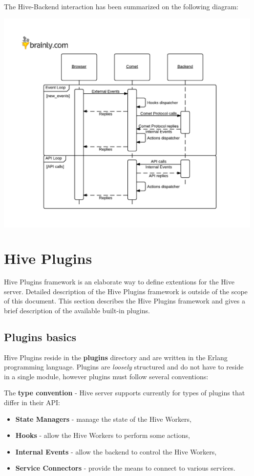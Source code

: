 \documentclass[a4paper]{article}
\begin{document}
\noindent
The Hive-Backend interaction has been summarized on the following diagram:

\begin{center}
\includegraphics[scale=1.0]{./img/hive_usage.pdf}
\end{center}
\section{Hive Plugins}
\label{sec-8}
\label{ref-plugins}

Hive Plugins framework is an elaborate way to define extentions for the Hive server. Detailed description of the Hive Plugins framework is outside of the scope of this document. This section describes the Hive Plugins framework and gives a brief description of the available built-in plugins.
\subsection{Plugins basics}
\label{sec-8-1}

Hive Plugins reside in the \textbf{plugins} directory and are written in the Erlang programming language. Plugins are \emph{loosely} structured and do not have to reside in a single module, however plugins must follow several conventions:

\noindent
The \textbf{type convention} - Hive server supports currently for types of plugins that differ in their API:


\begin{itemize}
\item \textbf{State Managers} - manage the state of the Hive Workers,
\item \textbf{Hooks} - allow the Hive Workers to perform some actions,
\item \textbf{Internal Events} - allow the backend to control the Hive Workers,
\item \textbf{Service Connectors} - provide the means to connect to various services.
\end{itemize}
\end{document}
